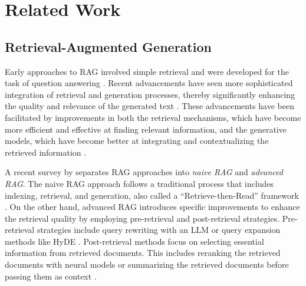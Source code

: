 \section{Related Work}
\subsection{Retrieval-Augmented Generation}
Early approaches to RAG involved simple retrieval and were developed for the task of question answering \cite{chen-etal-2017-reading}. Recent advancements have seen more sophisticated integration of retrieval and generation processes, thereby significantly enhancing the quality and relevance of the generated text \cite{lewis2020retrieval}.
These advancements have been facilitated by improvements in both the retrieval mechanisms, which have become more efficient and effective at finding relevant information, and the generative models, which have become better at integrating and contextualizing the retrieved information \cite{cai2022recent}.

A recent survey by \citet{gao2024retrievalaugmented} separates RAG approaches into \textit{naive RAG} and \textit{advanced RAG}. The naive RAG approach follows a traditional process that includes indexing, retrieval, and generation, also called a “Retrieve-then-Read” framework \cite{zhu2021retrieving}. 
On the other hand, advanced RAG introduces specific improvements to enhance the retrieval quality by employing pre-retrieval and post-retrieval strategies. Pre-retrieval strategies include query rewriting with an LLM \cite{ma-etal-2023-query} or query expansion methods like HyDE \cite{gao-etal-2023-precise}.
Post-retrieval methods focus on selecting essential information from retrieved documents. This includes reranking the retrieved documents with neural models \cite{glass-etal-2022-re2g} or summarizing the retrieved documents before passing them as context \cite{an2021retrievalsum}. 


